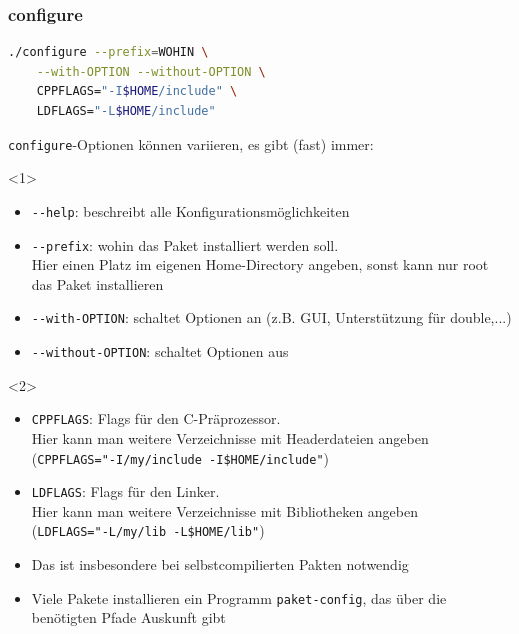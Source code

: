 \documentclass{slides}
\begin{document}
\begin{frame}[fragile]
  \frametitle{configure}
\begin{lstlisting}[language=bash]
./configure --prefix=WOHIN \
    --with-OPTION --without-OPTION \
    CPPFLAGS="-I$HOME/include" \
    LDFLAGS="-L$HOME/include"
\end{lstlisting}

  \lstinline!configure!-Optionen können variieren, es gibt (fast) immer:
  \begin{onlyenv}<1>
    \begin{itemize}
    \item \lstinline!--help!: beschreibt alle Konfigurationsmöglichkeiten
    \item \lstinline!--prefix!: wohin das Paket installiert werden soll.\\
      Hier einen Platz im eigenen Home-Directory angeben, sonst kann nur root das Paket installieren
    \item \lstinline!--with-OPTION!: schaltet Optionen an (z.B. GUI, Unterstützung für double,...)
    \item \lstinline!--without-OPTION!: schaltet Optionen aus
    \end{itemize}
  \end{onlyenv}

  \begin{onlyenv}<2>
    \begin{itemize}
    \item \lstinline!CPPFLAGS!: Flags für den C-Präprozessor.\\
      Hier kann man weitere Verzeichnisse mit Headerdateien angeben\\
      (\lstinline!CPPFLAGS="-I/my/include -I$HOME/include"!)
    \item \lstinline!LDFLAGS!: Flags für den Linker.\\
      Hier kann man weitere Verzeichnisse mit Bibliotheken angeben
      \\(\lstinline!LDFLAGS="-L/my/lib -L$HOME/lib"!)
    \item Das ist insbesondere bei selbstcompilierten Pakten notwendig
    \item Viele Pakete installieren ein Programm \lstinline!paket-config!, das über die benötigten
      Pfade Auskunft gibt
    \end{itemize}
  \end{onlyenv}
\end{frame}
\end{document}
